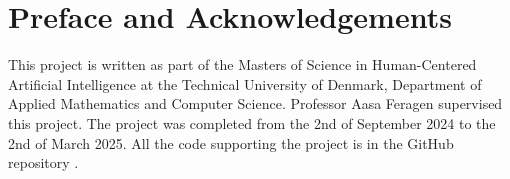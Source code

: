 \section*{Preface and Acknowledgements}
This project is written as part of the Masters of Science in Human-Centered Artificial Intelligence at the Technical University of Denmark, Department of Applied Mathematics and Computer Science. Professor Aasa Feragen supervised this project. The project was completed from the 2nd of September 2024 to the 2nd of March 2025. All the code supporting the project is in the GitHub repository .